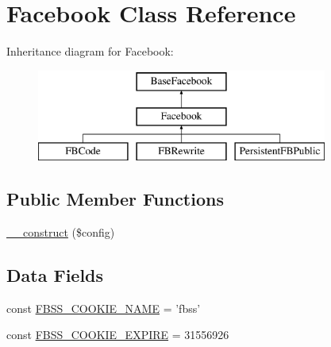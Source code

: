 \hypertarget{class_facebook}{\section{Facebook Class Reference}
\label{class_facebook}
}
Inheritance diagram for Facebook\-:\begin{figure}[H]
\begin{center}
\leavevmode
\includegraphics[height=3.000000cm]{class_facebook}
\end{center}
\end{figure}
\subsection*{Public Member Functions}
\begin{DoxyCompactItemize}
\item 
\hyperlink{class_facebook_acf2ad978657d47ceab41038dc7d95737}{\-\_\-\-\_\-construct} (\$config)
\end{DoxyCompactItemize}
\subsection*{Data Fields}
\begin{DoxyCompactItemize}
\item 
const \hyperlink{class_facebook_a7fe11167b435307400289ab8a97ddd89}{F\-B\-S\-S\-\_\-\-C\-O\-O\-K\-I\-E\-\_\-\-N\-A\-M\-E} = 'fbss'
\item 
const \hyperlink{class_facebook_a53f51f4f29c99753c6e3de7c6b0af302}{F\-B\-S\-S\-\_\-\-C\-O\-O\-K\-I\-E\-\_\-\-E\-X\-P\-I\-R\-E} = 31556926
\end{DoxyCompactItemize}
